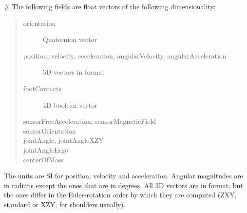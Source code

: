 \documentclass[letterpaper,10pt,english,openany,oneside]{sphinxmanual}
\begin{document}
\# The following fields are float vectors of the following dimensionality:
\begin{quote}\begin{description}
\item[{orientation}] \leavevmode
{} Quaternion vector

\item[{position, velocity, acceleration, angularVelocity, angularAcceleration}] \leavevmode
{} 3D vectors in  format

\item[{footContacts}] \leavevmode
{} 4D boolean vector

\item[{sensorFreeAcceleration, sensorMagneticField}] \leavevmode
{}

\item[{sensorOrientation}] \leavevmode
{}

\item[{jointAngle, jointAngleXZY}] \leavevmode
{}

\item[{jointAngleErgo}] \leavevmode
{}

\item[{centerOfMass}] \leavevmode
{}

\end{description}\end{quote}

The units are SI for position, velocity and acceleration. Angular magnitudes
are in radians except the  ones that are in degrees. All 3D
vectors are in  format, but the  ones differ in
the Euler-rotation order by which they are computed (ZXY, standard or XZY,
for shoulders usually).
\end{document}
